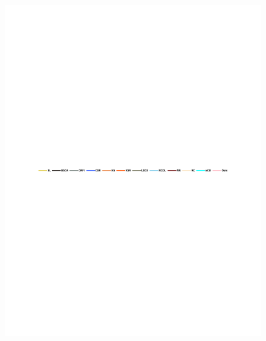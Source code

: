 \documentclass[journal]{IEEEtran}
\begin{document}
\begin{figure}[htbp]
\begin{center}
\includegraphics[width=1\linewidth]{label.pdf}\\

\end{center}
\end{figure}
\end{document}
